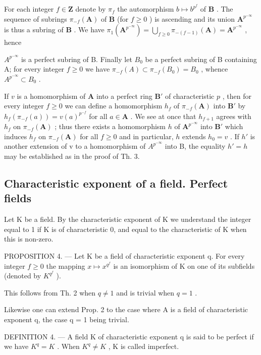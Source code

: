 For each integer \(f \in \mathbf{Z}\) denote by \(\pi_f\) the automorphism \(b \mapsto b^{p^f}\) of \(\mathbf{B}\) . The sequence of subrings \(\pi_{-f}(\mathbf{A})\) of \(\mathbf{B}\) (for \(f \geqslant 0\) ) is ascending and its union \(\mathbf{A}^{p^{-\infty}}\) is thus a subring of \(\mathbf{B}\) . We have \(\pi_1(\mathbf{A}^{p^{-\infty}}) = \bigcup_{f \geqslant 0} \pi_{-(f-1)}(\mathbf{A}) = \mathbf{A}^{p^{-\infty}}\) , hence

\(A^{p^{-\infty}}\) is a perfect subring of B. Finally let \(B_0\) be a perfect subring of B containing A; for every integer \(f \geqslant 0\) we have \(\pi_{-f}(A) \subset \pi_{-f}(B_0) = B_0\) , whence \(A^{p^{-\infty}} \subset B_0\) .

If \(v\) is a homomorphism of \(\mathbf{A}\) into a perfect ring \(\mathbf{B}'\) of characteristic \(p\) , then for every integer \(f \geqslant 0\) we can define a homomorphism \(h_f\) of \(\pi_{-f}(\mathbf{A})\) into \(\mathbf{B}'\) by \(h_f(\pi_{-f}(a)) = v(a)^{p^{-f}}\) for all \(a \in \mathbf{A}\) . We see at once that \(h_{f + 1}\) agrees with \(h_f\) on \(\pi_{-f}(\mathbf{A})\) ; thus there exists a homomorphism \(h\) of \(\mathbf{A}^{p^{-\infty}}\) into \(\mathbf{B}'\) which induces \(h_f\) on \(\pi_{-f}(\mathbf{A})\) for all \(f \geqslant 0\) and in particular, \(h\) extends \(h_0 = v\) . If \(h'\) is another extension of v to a homomorphism of \(A^{p^{-\infty}}\) into B, the equality \(h' = h\) may be established as in the proof of Th. 3.

\subsection{Characteristic exponent of a field. Perfect fields}

Let K be a field. By the characteristic exponent of K we understand the integer equal to 1 if K is of characteristic 0, and equal to the characteristic of K when this is non-zero.

PROPOSITION 4. --- Let K be a field of characteristic exponent q. For every integer \(f \geqslant 0\) the mapping \(x \mapsto x^{q^{f}}\) is an isomorphism of K on one of its subfields (denoted by \(K^{q^{f}}\) ).

This follows from Th. 2 when \(q \neq 1\) and is trivial when \(q = 1\) .

Likewise one can extend Prop. 2 to the case where A is a field of characteristic exponent q, the case q = 1 being trivial.

DEFINITION 4. --- A field K of characteristic exponent q is said to be perfect if we have \(K^{q} = K\) . When \(K^{q} \neq K\) , K is called imperfect.

